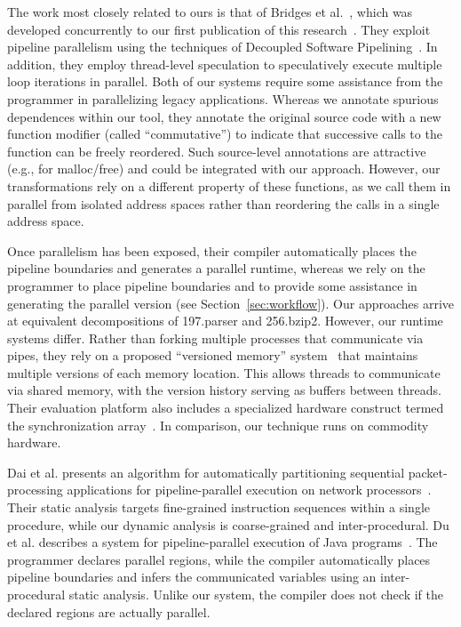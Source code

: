 The work most closely related to ours is that of Bridges et
al.~\cite{bridges07revisiting}, which was developed concurrently to
our first publication of this research~\cite{thies-micro07}.  They
exploit pipeline parallelism using the techniques of Decoupled
Software Pipelining~\cite{ottoni05decoupled,rangan04array}.  In
addition, they employ thread-level speculation to speculatively
execute multiple loop iterations in parallel.  Both of our systems
require some assistance from the programmer in parallelizing legacy
applications.  Whereas we annotate spurious dependences within our
tool, they annotate the original source code with a new function
modifier (called ``commutative'') to indicate that successive calls to
the function can be freely reordered.  Such source-level annotations
are attractive (e.g., for malloc/free) and could be integrated with
our approach.  However, our transformations rely on a different
property of these functions, as we call them in parallel from isolated
address spaces rather than reordering the calls in a single address
space.

Once parallelism has been exposed, their compiler automatically places
the pipeline boundaries and generates a parallel runtime, whereas we
rely on the programmer to place pipeline boundaries and to provide
some assistance in generating the parallel version (see
Section~\ref{sec:workflow}).  Our approaches arrive at equivalent
decompositions of 197.parser and 256.bzip2.  However, our runtime
systems differ.  Rather than forking multiple processes that
communicate via pipes, they rely on a proposed ``versioned memory''
system~\cite{vachharajani07speculation} that maintains multiple
versions of each memory location.  This allows threads to communicate
via shared memory, with the version history serving as buffers between
threads.  Their evaluation platform also includes a specialized
hardware construct termed the synchronization
array~\cite{rangan04array}.  In comparison, our technique runs on
commodity hardware.

Dai et al. presents an algorithm for automatically partitioning
sequential packet-processing applications for pipeline-parallel
execution on network processors~\cite{dai05packet}.  
Their static analysis targets fine-grained instruction sequences
within a single procedure, while our dynamic analysis is
coarse-grained and inter-procedural.  Du et al. describes a system for
pipeline-parallel execution of Java programs~\cite{du03sc}.  The
programmer declares parallel regions, while the compiler automatically
places pipeline boundaries and infers the communicated variables using
an inter-procedural static analysis.  Unlike our system, the compiler
does not check if the declared regions are actually parallel.

